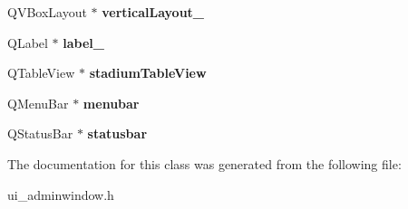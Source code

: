 \begin{DoxyCompactItemize}
Q\+V\+Box\+Layout $\ast$ {\bfseries vertical\+Layout\+\_}
\item 
\mbox{\label{class_ui__admin_window_abdcf692aef6f34db8f184c07807ddcd0}} 
Q\+Label $\ast$ {\bfseries label\+\_}
\item 
\mbox{\label{class_ui__admin_window_a926806214476710cc711e82986b9ae0f}} 
Q\+Table\+View $\ast$ {\bfseries stadium\+Table\+View}
\item 
\mbox{\label{class_ui__admin_window_a98cd502dd8efcf672c2faea2783f3ec4}} 
Q\+Menu\+Bar $\ast$ {\bfseries menubar}
\item 
\mbox{\label{class_ui__admin_window_accb31cc05b2f6f5f6ce1bf13a5a3d210}} 
Q\+Status\+Bar $\ast$ {\bfseries statusbar}
\end{DoxyCompactItemize}


The documentation for this class was generated from the following file\+:\begin{DoxyCompactItemize}
\item 
ui\+\_\+adminwindow.\+h\end{DoxyCompactItemize}

